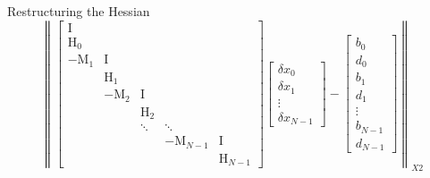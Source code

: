 \documentclass[9pt]{beamer}
\newcommand{\opl}[1]{\mathrm{{#1}}}
\begin{document}
\begin{frame}[fragile]{Restructuring the Hessian}
\begin{equation}
\left\| 
\begin{bmatrix} 
  \opl{I}   &                &                 &     \\
  \opl{H}_0 &                &                 &         \\              
 -\opl{M}_1 & \opl{I}        &                &     \\
            &  \opl{H}_1     &                &         \\
            &  -\opl{M}_2    & \opl{I}        &     \\
            &                &  \opl{H}_2      &         \\
            &                &  \ddots & \ddots         &      \\
            &                &                & -\opl{M}_{N-1} & \opl{I} \\ 
            &                &                &          & \opl{H}_{N-1}   
\end{bmatrix} 
\begin{bmatrix}
 \delta x_0 \\
 \delta x_1 \\ 
 \vdots  \\
 \delta x_{N-1} 
\end{bmatrix}
- 
\begin{bmatrix} 
b_0 \\
d_0 \\
b_1 \\ 
d_1 \\
\vdots \\
b_{N-1} \\ 
d_{N-1}
\end{bmatrix} 
\right\|_{X2}
\end{equation}

\end{frame} 
\end{document}
